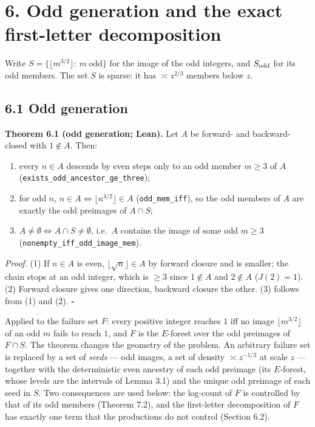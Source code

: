 \documentclass[11pt,a4paper]{article}
\providecommand{\tightlist}{\setlength{\itemsep}{0pt}\setlength{\parskip}{0pt}}
\begin{document}
\section{6. Odd generation and the exact first-letter
decomposition}\label{odd-generation-and-the-exact-first-letter-decomposition}

Write \(S=\{\lfloor m^{3/2}\rfloor:\ m\ \text{odd}\}\) for the image of
the odd integers, and \(S_{\rm odd}\) for its odd members. The set \(S\)
is sparse: it has \(\asymp z^{2/3}\) members below \(z\).

\subsection{6.1 Odd generation}\label{odd-generation}

\textbf{Theorem 6.1 (odd generation; Lean).} Let \(A\) be forward- and
backward-closed with \(1\notin A\). Then:

\begin{enumerate}
\def\labelenumi{\arabic{enumi}.}
\tightlist
\item
  every \(n\in A\) descends by even steps only to an odd member
  \(m\ge 3\) of \(A\)
  (\texttt{\nolinkurl{exists_odd_ancestor_ge_three}});
\item
  for odd \(n\), \(n\in A\iff\lfloor n^{3/2}\rfloor\in A\)
  (\texttt{\nolinkurl{odd_mem_iff}}), so the odd members of \(A\) are
  exactly the odd preimages of \(A\cap S\);
\item
  \(A\ne\emptyset\iff A\cap S\ne\emptyset\), i.e.~\(A\) contains the
  image of some odd \(m\ge 3\)
  (\texttt{\nolinkurl{nonempty_iff_odd_image_mem}}).
\end{enumerate}

\emph{Proof.} (1) If \(n\in A\) is even, \(\lfloor\sqrt n\rfloor\in A\)
by forward closure and is smaller; the chain stops at an odd integer,
which is \(\ge 3\) since \(1\notin A\) and \(2\notin A\) (\(J(2)=1\)).
(2) Forward closure gives one direction, backward closure the other. (3)
follows from (1) and (2). \(\square\)

Applied to the failure set \(F\): every positive integer reaches \(1\)
iff no image \(\lfloor m^{3/2}\rfloor\) of an odd \(m\) fails to reach
\(1\), and \(F\) is the \(E\)-forest over the odd preimages of
\(F\cap S\). The theorem changes the geometry of the problem. An
arbitrary failure set is replaced by a set of \emph{seeds} --- odd
images, a set of density \(\asymp z^{-1/3}\) at scale \(z\) --- together
with the deterministic even ancestry of each odd preimage (its
\(E\)-forest, whose levels are the intervals of Lemma 3.1) and the
unique odd preimage of each seed in \(S\). Two consequences are used
below: the log-count of \(F\) is controlled by that of its odd members
(Theorem 7.2), and the first-letter decomposition of \(F\) has exactly
one term that the productions do not control (Section 6.2).
\end{document}

